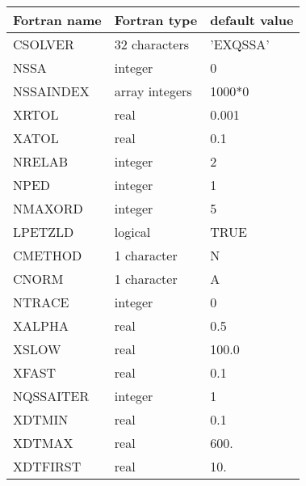 \begin{center}
\begin{tabular} {|l|l|l|}
\hline
Fortran name & Fortran type & default value \\
\hline
CSOLVER 	&32 characters 	&'EXQSSA'\\
NSSA 		&integer 	&0\\
NSSAINDEX 	&array integers &1000*0\\
XRTOL 		&real 		&0.001\\
XATOL 		&real 		&0.1\\
NRELAB 		&integer 	&2\\
NPED 		&integer 	&1\\
NMAXORD 	&integer 	&5\\
LPETZLD 	&logical 	&TRUE\\
CMETHOD 	&1 character 	&N\\
CNORM 		&1 character 	&A\\
NTRACE 		&integer 	&0\\
XALPHA 		&real 		&0.5\\
XSLOW 		&real 		&100.0\\
XFAST 		&real 		&0.1\\
NQSSAITER 	&integer 	&1\\
XDTMIN 		&real	 	&0.1\\
XDTMAX 		&real	 	&600.\\
XDTFIRST 	&real 		&10.\\
\hline
\end{tabular}
\end{center}
